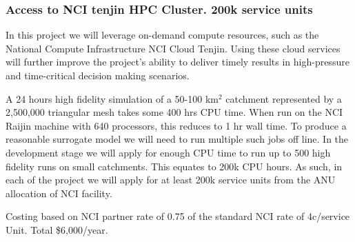 \documentclass[a4paper,fontsize=12pt]{scrartcl}
\begin{document}
\subsubsection*{Access to NCI tenjin HPC Cluster. 200k service units}

In this project we will leverage on-demand compute resources, 
such as the National Compute Infrastructure NCI Cloud Tenjin. 
Using these cloud services will further improve the project's 
ability to deliver timely results in high-pressure and 
time-critical decision making scenarios.

A 24 hours high fidelity simulation of a 50-100 km$^2$ catchment 
represented by a 2,500,000 triangular mesh takes 
some 400 hrs  CPU time. When run on the NCI Raijin machine 
with 640 processors, this reduces to 1 hr wall time.
To produce a reasonable surrogate model we will need to run multiple
such jobs off line.  
In the development stage we will apply for enough CPU time
to run up to 500 high fidelity runs on small catchments. 
This equates to 200k CPU hours.   
As such, in each of the project we will apply for at least
200k service units from the ANU allocation of NCI facility.  

Costing based on NCI partner rate of 0.75  of the standard 
NCI rate of 4c/service Unit. Total \$6,000/year. 
\end{document}
